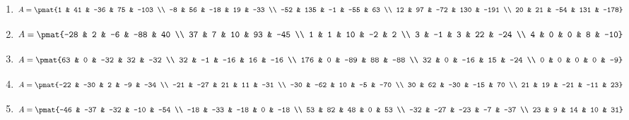 \begin{enumerate}
\item

\begin{align*}
A = \pmat{1 & 41 & -36 & 75 & -103 \\ -8 & 56 & -18 & 19 & -33 \\ -52 & 135 & -1 & -55 & 63 \\ 12 & 97 & -72 & 130 & -191 \\ 20 & 21 & -54 & 131 & -178}
\end{align*}

\item

\begin{align*}
A = \pmat{-28 & 2 & -6 & -88 & 40 \\ 37 & 7 & 10 & 93 & -45 \\ 1 & 1 & 10 & -2 & 2 \\ 3 & -1 & 3 & 22 & -24 \\ 4 & 0 & 0 & 8 & -10}
\end{align*}

\item

\begin{align*}
A = \pmat{63 & 0 & -32 & 32 & -32 \\ 32 & -1 & -16 & 16 & -16 \\ 176 & 0 & -89 & 88 & -88 \\ 32 & 0 & -16 & 15 & -24 \\ 0 & 0 & 0 & 0 & -9}
\end{align*}

\item

\begin{align*}
A = \pmat{-22 & -30 & 2 & -9 & -34 \\ -21 & -27 & 21 & 11 & -31 \\ -30 & -62 & 10 & -5 & -70 \\ 30 & 62 & -30 & -15 & 70 \\ 21 & 19 & -21 & -11 & 23}
\end{align*}

\item

\begin{align*}
A = \pmat{-46 & -37 & -32 & -10 & -54 \\ -18 & -33 & -18 & 0 & -18 \\ 53 & 82 & 48 & 0 & 53 \\ -32 & -27 & -23 & -7 & -37 \\ 23 & 9 & 14 & 10 & 31}
\end{align*}


\end{enumerate}

